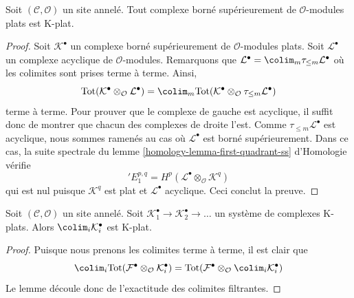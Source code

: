 \begin{lemma}
\label{lemma-bounded-flat-K-flat}
Soit $(\mathcal{C}, \mathcal{O})$ un site annelé. Tout complexe borné
supérieurement de $\mathcal{O}$-modules plats est K-plat.
\end{lemma}

\begin{proof}
Soit $\mathcal{K}^\bullet$ un complexe borné supérieurement de
$\mathcal{O}$-modules plats. Soit $\mathcal{L}^\bullet$ un complexe acyclique
de $\mathcal{O}$-modules. Remarquons que
$\mathcal{L}^\bullet = \colim_m \tau_{\leq m}\mathcal{L}^\bullet$
où les colimites sont prises terme à terme. Ainsi,
$$
\text{Tot}(\mathcal{K}^\bullet \otimes_\mathcal{O} \mathcal{L}^\bullet)
=
\colim_m \text{Tot}(
\mathcal{K}^\bullet \otimes_\mathcal{O} \tau_{\leq m}\mathcal{L}^\bullet)
$$
terme à terme. Pour prouver que le complexe de gauche est acyclique, il suffit
donc de montrer que chacun des complexes de droite l'est. Comme
$\tau_{\leq m}\mathcal{L}^\bullet$ est acyclique, nous sommes ramenés au cas
où $\mathcal{L}^\bullet$ est borné supérieurement.
Dans ce cas, la suite spectrale du
lemme \ref{homology-lemma-first-quadrant-ss} d'Homologie vérifie
$$
{}'E_1^{p, q} = H^p(\mathcal{L}^\bullet \otimes_\mathcal{O} \mathcal{K}^q)
$$
qui est nul puisque $\mathcal{K}^q$ est plat et $\mathcal{L}^\bullet$
acyclique. Ceci conclut la preuve.
\end{proof}

\begin{lemma}
\label{lemma-colimit-K-flat}
Soit $(\mathcal{C}, \mathcal{O})$ un site annelé.
Soit $\mathcal{K}_1^\bullet \to \mathcal{K}_2^\bullet \to \ldots$
un système de complexes K-plats.
Alors $\colim_i \mathcal{K}_i^\bullet$ est K-plat.
\end{lemma}

\begin{proof}
Puisque nous prenons les colimites terme à terme, il est clair que
$$
\colim_i \text{Tot}(
\mathcal{F}^\bullet \otimes_\mathcal{O} \mathcal{K}_i^\bullet)
=
\text{Tot}(\mathcal{F}^\bullet \otimes_\mathcal{O}
\colim_i \mathcal{K}_i^\bullet)
$$
Le lemme découle donc de l'exactitude des colimites filtrantes.
\end{proof}


